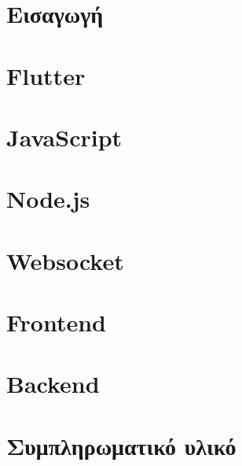 \documentclass[a4paper, 11pt]{report}
\begin{document}
\chapter{Εισαγωγή}


\chapter{Flutter}


\chapter{JavaScript}


\chapter{Node.js}


\chapter{Websocket}

\chapter{Frontend}


\chapter{Backend}


\appendix
\chapter{Συμπληρωματικό υλικό}


\printbibliography
\end{document}
